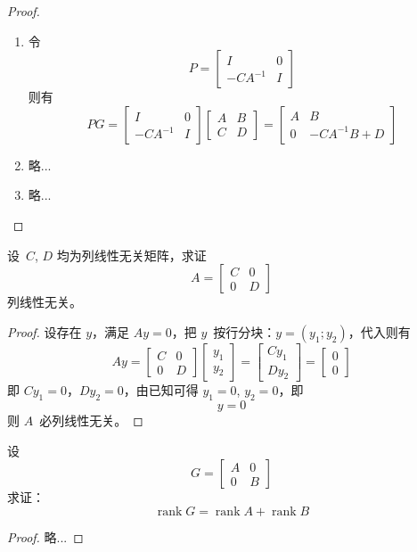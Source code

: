 \documentclass[twoside,openright]{book}
\begin{document}
\begin{CJK*}{UTF8}{}
\begin{proof}
\begin{enumerate}
\item
令
\[
P=
\begin{bmatrix}
I & 0 \\
-C A^{-1} & I
\end{bmatrix}
\]
则有
\[
P G=
\begin{bmatrix}
I & 0 \\
-C A^{-1} & I
\end{bmatrix}
\begin{bmatrix}
A & B \\
C & D
\end{bmatrix}
=
\begin{bmatrix}
A & B \\
0 & -C A^{-1} B + D
\end{bmatrix}
\]
\item
略...
\item
略...
\end{enumerate}
\end{proof}

\begin{quest}
\label{quest:26}
设\ $C$, $D$ 均为列线性无关矩阵，求证
\[
A=
\begin{bmatrix}
C & 0 \\
0 & D
\end{bmatrix}
\]
列线性无关。
\end{quest}
\begin{proof}
设存在 $y$，满足 $A y = 0$，把 $y$\ 按行分块：$y=(y_1;y_2)$，代入则有
\[
A y =
\begin{bmatrix}
C & 0 \\
0 & D
\end{bmatrix}
\begin{bmatrix}
y_1 \\
y_2
\end{bmatrix}
=
\begin{bmatrix}
C y_1 \\
D y_2
\end{bmatrix}
=
\begin{bmatrix}
0 \\
0
\end{bmatrix}
\]
即 $C y_1=0$，$D y_2=0$，由已知可得 $y_1=0$, $y_2=0$，即
\[
y=0
\]
则 $A$\ 必列线性无关。
\end{proof}

\begin{quest}
\label{quest:27}
设
\[
G=
\begin{bmatrix}
A & 0 \\
0 & B
\end{bmatrix}
\]
求证：
\[
\operatorname{rank}G=
\operatorname{rank}A+
\operatorname{rank}B
\]
\end{quest}
\begin{proof}
略...
\end{proof}


\end{CJK*}
\end{document}
